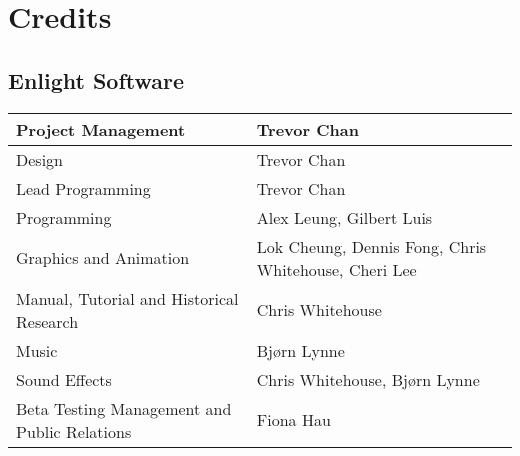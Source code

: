
\chapter{Credits}

\section{Enlight Software}

\begin{center}
\begin{tabular}{|p{1.5in}|p{2.5in}|}
	\hline
	Project Management	& Trevor Chan \\ \hline
Design	& Trevor Chan \\ \hline
Lead Programming	& Trevor Chan \\ \hline
Programming	& Alex Leung, Gilbert Luis \\ \hline
Graphics and Animation	& Lok Cheung, Dennis Fong, Chris Whitehouse, Cheri Lee \\ \hline
Manual, Tutorial and Historical Research	& Chris Whitehouse \\ \hline
Music	& Bjørn Lynne \\ \hline
Sound Effects	& Chris Whitehouse, Bjørn Lynne \\ \hline
Beta Testing Management and Public Relations	& Fiona Hau \\ \hline
\end{tabular}
\end{center}

